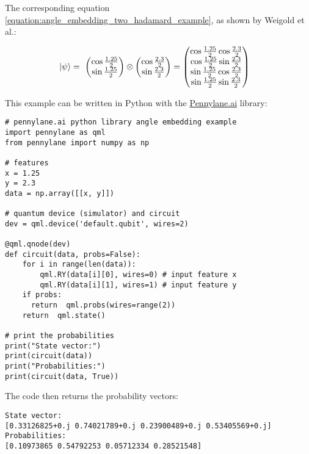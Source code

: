 The corresponding equation \ref{equation:angle_embedding_two_hadamard_example}, as shown by Weigold et al.\cite{Weigold2021_ExpandingDataEncodingPatterns}:

\begin{equation}
    \centering
    \begin{split}
        \ket{\psi} &=\ \begin{pmatrix}\cos{\frac{1.25}{2}} \\ \sin{\frac{1.25}{2}}\end{pmatrix} \otimes \begin{pmatrix}\cos{\frac{2.3}{2}} \\ \sin{\frac{2.3}{2}}\end{pmatrix} = \begin{pmatrix}
            \cos{\frac{1.25}{2}}\cos{\frac{2.3}{2}}\\
            \cos{\frac{1.25}{2}}\sin{\frac{2.3}{2}}\\
            \sin{\frac{1.25}{2}}\cos{\frac{2.3}{2}}\\
            \sin{\frac{1.25}{2}}\sin{\frac{2.3}{2}}
        \end{pmatrix}
    \end{split}
    \label{equation:angle_embedding_two_hadamard_example}
\end{equation}

\newpage
This example can be written in Python with the \href{https://www.pennylane.ai}{Pennylane.ai} library:

\begin{verbatim}
# pennylane.ai python library angle embedding example
import pennylane as qml
from pennylane import numpy as np

# features
x = 1.25
y = 2.3
data = np.array([[x, y]])

# quantum device (simulator) and circuit
dev = qml.device('default.qubit', wires=2)

@qml.qnode(dev)
def circuit(data, probs=False):
    for i in range(len(data)):
        qml.RY(data[i][0], wires=0) # input feature x
        qml.RY(data[i][1], wires=1) # input feature y
    if probs:
      return  qml.probs(wires=range(2))
    return  qml.state()

# print the probabilities
print("State vector:")
print(circuit(data))
print("Probabilities:")
print(circuit(data, True))
\end{verbatim}

\noindent The code then returns the probability vectors:
\begin{verbatim}
State vector:
[0.33126825+0.j 0.74021789+0.j 0.23900489+0.j 0.53405569+0.j]
Probabilities:
[0.10973865 0.54792253 0.05712334 0.28521548]
\end{verbatim}


